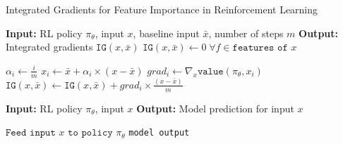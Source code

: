 \documentclass[UKenglish]{uiomasterthesis}
\begin{document}
\begin{algorithm}
\caption{Integrated Gradients for Feature Importance in Reinforcement Learning}
\label{alg:intgrad}
\begin{algorithmic}
    \State \textbf{Input:} RL policy $\pi_\theta$, input $x$, baseline input $\bar{x}$, number of steps $m$
    \State \textbf{Output:} Integrated gradients $\texttt{IG}(x, \bar{x})$
    \State $\texttt{IG}(x, \bar{x}) \gets 0 \; \forall f \in \texttt{features of } x$ 
    
        \State $\alpha_i \gets \frac{i}{m}$
        \State $x_i \gets \bar{x} + \alpha_i \times (x - \bar{x})$
        \State $grad_i \gets \nabla_x \texttt{value}(\pi_\theta, x_i)$ 
        \State $\texttt{IG}(x, \bar{x}) \gets \texttt{IG}(x, \bar{x}) + grad_i \times \frac{(x - \bar{x})}{m}$
    \EndFor
    
        \State \textbf{Input:} RL policy $\pi_\theta$, input $x$
        \State \textbf{Output:} Model prediction for input $x$
        
        \State $\texttt{Feed input } x \texttt{ to policy } \pi_\theta$
        \State \Return \texttt{model output}
    \EndFunction
\end{algorithmic}
\end{algorithm}
\end{document}
